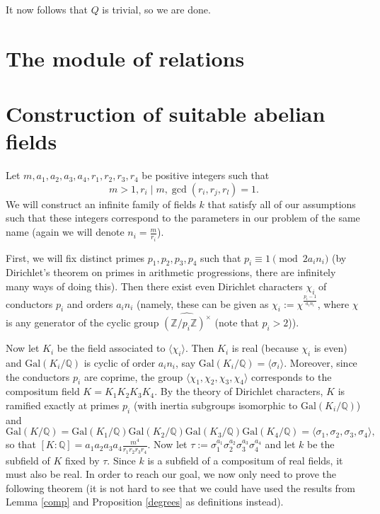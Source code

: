 \documentclass[12pt,a4paper]{article}
\theoremstyle{definition}
\newcommand{\Q}{\mathbb{Q}}
\newcommand{\Z}{\mathbb{Z}}
\newcommand{\Gal}{\mathrm{Gal}}
\begin{document}
It now follows that $Q$ is trivial, so we are done.
\section{The module of relations}
\section{Construction of suitable abelian fields}
Let $m,a_1,a_2,a_3,a_4,r_1,r_2,r_3,r_4$ be positive integers such that 
$$m>1, r_i\mid m, \gcd(r_i,r_j,r_l)=1.$$
We will construct an infinite family of fields $k$ that satisfy all of our assumptions such that these integers correspond to the parameters in our problem of the same name (again we will denote $n_i=\frac{m}{r_i}$).

First, we will fix distinct primes $p_1,p_2,p_3,p_4$ such that $p_i\equiv 1\pmod{ 2a_in_i}$ (by Dirichlet's theorem on primes in arithmetic progressions, there are infinitely many ways of doing this). Then there exist even Dirichlet characters $\chi_i$ of conductors $p_i$ and orders $a_in_i$ (namely, these can be given as $\chi_i:=\chi^{\frac{p_i-1}{a_in_i}}$, where $\chi$ is any generator of the cyclic group $\widehat{(\Z/p_i\Z)^\times}$ (note that $p_i>2$)).

Now let $K_i$ be the field associated to $\langle \chi_i\rangle$. Then $K_i$ is real (because $\chi_i$ is even) and $\Gal(K_i/\Q)$ is cyclic of order $a_in_i$, say $\Gal(K_i/\Q)=\langle \sigma_i\rangle$. Moreover, since the conductors $p_i$ are coprime, the group $\langle \chi_1,\chi_2,\chi_3,\chi_4\rangle$ corresponds to the compositum field $K=K_1K_2K_3K_4$. By the theory of Dirichlet characters, $K$ is ramified exactly at primes $p_i$ (with inertia subgroups isomorphic to $\Gal(K_i/\Q)$) and $$\Gal(K/\Q)=\Gal(K_1/\Q)\Gal(K_2/\Q)\Gal(K_3/\Q)\Gal(K_4/\Q)=\langle\sigma_1,\sigma_2,\sigma_3,\sigma_4\rangle,$$
so that $[K:\Q]=a_1a_2a_3a_4\frac{m^4}{r_1r_2r_3r_4}$. Now let $\tau:=\sigma_1^{a_1}\sigma_2^{a_2}\sigma_3^{a_3}\sigma_4^{a_4}$ and let $k$ be the subfield of $K$ fixed by $\tau$. Since $k$ is a subfield of a compositum of real fields, it must also be real. In order to reach our goal, we now only need to prove the following theorem (it is not hard to see that we could have used the results from Lemma \ref{comp} and Proposition \ref{degrees} as definitions instead).
\end{document}
